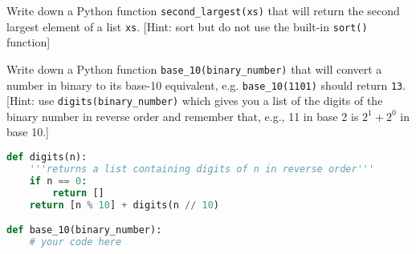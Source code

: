 \documentclass[addpoints,12pt]{exam}
\newcommand{\code}[1]{{\texttt{#1}}}
\begin{document}
\begin{questions}
\begin{enumerate}
\end{enumerate}

\newpage
\question[20] Write down a Python function \code{second\_largest(xs)} that will return the second largest element of a list \code{xs}.  [Hint: sort but do not use the built-in \code{sort()} function]


\newpage
\question[20] Write down a Python function \code{base\_10(binary\_number)} that will convert a number in binary to its base-10 equivalent, e.g. \code{base\_10(1101)} should return \code{13}. [Hint: use \code{digits(binary\_number)} which gives you a list of the digits of the binary number in reverse order
and remember that, e.g., 11 in base 2 is $2^1 + 2^0$ in base 10.] 

\begin{lstlisting}[language=python]
def digits(n): 
    '''returns a list containing digits of n in reverse order'''
    if n == 0:
        return []
    return [n % 10] + digits(n // 10)

def base_10(binary_number):
    # your code here
\end{lstlisting}

\end{questions}
\end{document}

